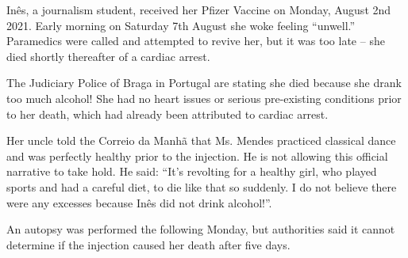 Inês, a journalism student, received her Pfizer Vaccine on Monday, August 2nd
2021. Early morning on Saturday 7th August she woke feeling “unwell.” Paramedics
were called and attempted to revive her, but it was too late – she died shortly
thereafter of a cardiac arrest.

The Judiciary Police of Braga in Portugal are stating she died because she drank
too much alcohol! She had no heart issues or serious pre-existing conditions
prior to her death, which had already been attributed to cardiac arrest.

Her uncle told the Correio da Manhã that Ms. Mendes practiced classical dance
and was perfectly healthy prior to the injection. He is not allowing this
official narrative to take hold. He said: “It’s revolting for a healthy girl,
who played sports and had a careful diet, to die like that so suddenly. I do not
believe there were any excesses because Inês did not drink alcohol!”.

An autopsy was performed the following Monday, but authorities said it cannot
determine if the injection caused her death after five days.

